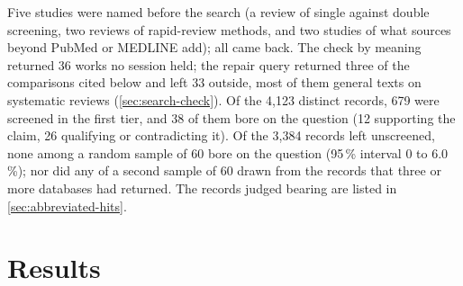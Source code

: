 Five studies were named before the search (a review of single against
double screening, two reviews of rapid-review methods, and two studies of
what sources beyond PubMed or MEDLINE add); all came back.
The check by meaning returned 36 works no session held; the repair query
returned three of the comparisons cited below and left 33 outside, most
of them general texts on systematic reviews (\cref{sec:search-check}).
Of the 4,123 distinct records, 679 were screened in the first tier, and
38 of them bore on the question (12 supporting the claim, 26 qualifying
or contradicting it).
Of the 3,384 records left unscreened, none among a random sample of 60
bore on the question (95\,\% interval 0 to 6.0\,\%); nor did any of a
second sample of 60 drawn from the records that three or more databases
had returned.
The records judged bearing are listed in \cref{sec:abbreviated-hits}.

\section{Results}
\label{sec:abbreviated-results}

